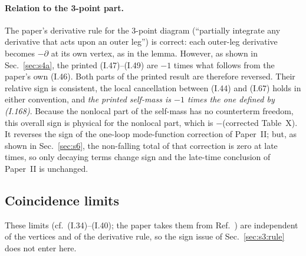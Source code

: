 \documentclass[aps,prd,onecolumn,10pt,nofootinbib,floatfix]{revtex4-2}
\newcommand{\PII}{Paper~II}
\newcommand{\eqI}[1]{(I.#1)}
\begin{document}
\paragraph*{Relation to the 3-point part.}
The paper's derivative rule for the 3-point diagram (``partially integrate any derivative that
acts upon an outer leg'') is correct: each outer-leg derivative becomes $-\partial$ at its own
vertex, as in the lemma. However, as shown in Sec.~\ref{sec:s4a}, the printed \eqI{47}--\eqI{49}
are $-1$ times what follows from the paper's own \eqI{46}. Both parts of the printed result are
therefore reversed. Their relative sign is consistent, the local cancellation between \eqI{44}
and \eqI{67} holds in either convention, and \emph{the printed self-mass is $-1$ times the one
defined by \eqI{168}}. Because the nonlocal part of the self-mass has no counterterm freedom,
this overall sign is physical for the nonlocal part, which is $-$(corrected Table~X). It reverses
the sign of the one-loop mode-function correction of \PII; but, as shown in Sec.~\ref{sec:s6}, the
non-falling total of that correction is zero at late times, so only decaying terms change sign and
the late-time conclusion of \PII{} is unchanged.

\subsection{Coincidence limits}
\label{sec:s3:coinc}

These limits (cf.\ \eqI{34}--\eqI{40}; the paper takes them from Ref.~\cite{ref:Tsamis2006})
are independent of the vertices and of the derivative rule, so the sign issue of
Sec.~\ref{sec:s3:rule} does not enter here.
\end{document}

